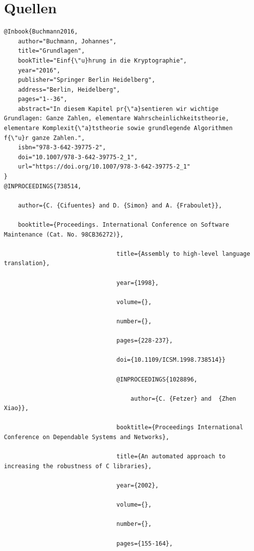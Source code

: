 \documentclass[a4paper,12pt]{scrartcl}
\begin{document}
\section{Quellen}
\begin{verbatim}
@Inbook{Buchmann2016,
	author="Buchmann, Johannes",
	title="Grundlagen",
	bookTitle="Einf{\"u}hrung in die Kryptographie",
	year="2016",
	publisher="Springer Berlin Heidelberg",
	address="Berlin, Heidelberg",
	pages="1--36",
	abstract="In diesem Kapitel pr{\"a}sentieren wir wichtige Grundlagen: Ganze Zahlen, elementare Wahrscheinlichkeitstheorie, elementare Komplexit{\"a}tstheorie sowie grundlegende Algorithmen f{\"u}r ganze Zahlen.",
	isbn="978-3-642-39775-2",
	doi="10.1007/978-3-642-39775-2_1",
	url="https://doi.org/10.1007/978-3-642-39775-2_1"
}
@INPROCEEDINGS{738514,
	
	author={C. {Cifuentes} and D. {Simon} and A. {Fraboulet}},
	
	booktitle={Proceedings. International Conference on Software Maintenance (Cat. No. 98CB36272)}, 
								
								title={Assembly to high-level language translation}, 
								
								year={1998},
								
								volume={},
								
								number={},
								
								pages={228-237},
								
								doi={10.1109/ICSM.1998.738514}}
								
								@INPROCEEDINGS{1028896,
									
									author={C. {Fetzer} and  {Zhen Xiao}},
								
								booktitle={Proceedings International Conference on Dependable Systems and Networks}, 
								
								title={An automated approach to increasing the robustness of C libraries}, 
								
								year={2002},
								
								volume={},
								
								number={},
								
								pages={155-164},
								

\end{verbatim}
\end{document}

